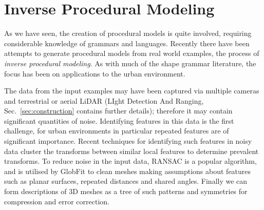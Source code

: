 
\section{Inverse Procedural Modeling}
\label{sec:inverse}

As we have seen, the creation of procedural models is quite involved, requiring considerable knowledge of grammars and languages. Recently there have been attempts to generate procedural models from real world examples, the process of \emph{inverse procedural modeling}. As with much of the shape grammar literature, the focus has been on applications to the urban environment.

The data from the input examples may have been captured via multiple cameras and terrestrial or aerial LiDAR (LIght Detection And Ranging, Sec.~\ref{sec:construction} contains further details); therefore it may contain significant quantities of noise. Identifying features in this data is the first challenge, for urban environments in particular repeated features are of significant importance. Recent techniques\cite{Mitra06,Pauly08} for identifying such features in noisy data cluster the transforms between similar local features to determine prevalent transforms. To reduce noise in the input data, RANSAC\cite{Fischler81} is a popular algorithm, and is utilised by GlobFit\cite{Li11} to clean meshes making assumptions about features such as planar surfaces, repeated distances and shared angles. Finally we can form descriptions of 3D meshes as a tree of such patterns and symmetries\cite{Wang11} for compression and error correction.





